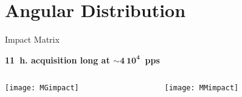 \section{Angular Distribution}

\begin{frame}{Impact Matrix}
    	\vspace{-0.05\textheight}
    \begin{overlayarea}{\textwidth}{0.1\textheight}
	\centering
	\textbf{11~h. acquisition long at $\mathbf{\sim 4\ 10^{4}}$~pps}
	\end{overlayarea}
	\begin{columns}
		\begin{column}{0.5\textwidth}
			\begin{overlayarea}{\textwidth}{\textheight}
				\centering
				\texttt{[image: MGimpact]}
			\end{overlayarea}
		\end{column}
		\begin{column}{0.5\textwidth}
			\begin{overlayarea}{\textwidth}{\textheight}
				\centering       
				\texttt{[image: MMimpact]}\\
		    \end{overlayarea}	
		\end{column}
	\end{columns}
\end{frame}


